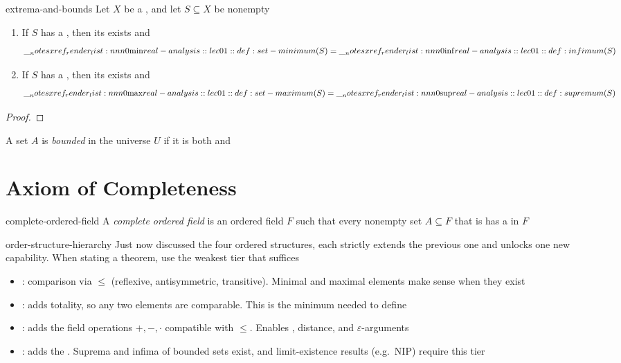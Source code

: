 \documentclass[12pt]{article}
\begin{document}
\begin{prop}{extrema-and-bounds}
  Let \(X\) be a , and let
  \(S\subseteq X\) be nonempty
  \begin{enumerate}[nosep]
    \item If \(S\) has a , then its
       exists and
      \[
        \setmin(S)=\inf(S)
      \]
    \item If \(S\) has a , then its
       exists and
      \[
        \setmax(S)=\sup(S)
      \]
  \end{enumerate}
\end{prop}

\begin{proof}
  \todo
\end{proof}

\begin{dfn}
  A set \(A\) is \emph{bounded} in the universe $U$ if it is both  and 
\end{dfn} 


\section{Axiom of Completeness} 

\begin{dfn}{complete-ordered-field}
  A \emph{complete ordered field} is an ordered field \(F\) such that every
  nonempty set \(A\subseteq F\) that is
   has a
   in \(F\)
\end{dfn}

\begin{rem}{order-structure-hierarchy}
Just now discussed the four ordered structures, each strictly extends the previous one and unlocks one new capability. When stating a theorem, use the weakest tier that suffices
\begin{itemize}[nosep]
  \item {}: comparison via \(\leq\) (reflexive, antisymmetric, transitive). Minimal and maximal elements make sense when they exist
  \item {}: adds totality, so any two elements are comparable. This is the minimum needed to define 
  \item {}: adds the field operations \(+,-,\cdot\) compatible with \(\leq\). Enables , distance, and \(\varepsilon\)-arguments
  \item {}: adds the . Suprema and infima of bounded sets exist, and limit-existence results (e.g.\ NIP) require this tier
\end{itemize}
\end{rem}
\end{document}
